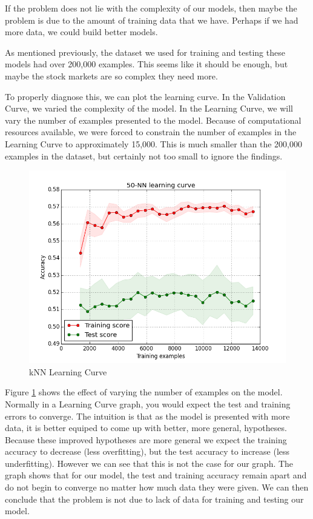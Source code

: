 \documentclass{report}
\begin{document}
If the problem does not lie with the complexity of our models, then maybe the problem is due to the amount of training data that we have. Perhaps if we had more data, we could build better models.

As mentioned previously, the dataset we used for training and testing these models had over 200,000 examples. This seems like it should be enough, but maybe the stock markets are so complex they need more.

To properly diagnose this, we can plot the learning curve. In the Validation Curve, we varied the complexity of the model. In the Learning Curve, we will vary the number of examples presented to the model. Because of computational resources available, we were forced to constrain the number of examples in the Learning Curve to approximately 15,000. This is much smaller than the 200,000 examples in the dataset, but certainly not too small to ignore the findings.

\begin{figure}[H]
	\caption{kNN Learning Curve}
	\centerline{\includegraphics[scale=0.75]{vis/50-learning-curve-15000.png}}
	\label{fig:knn-learning}
\end{figure}

Figure \ref{fig:knn-learning} shows the effect of varying the number of examples on the model. Normally in a Learning Curve graph, you would expect the test and training errors to converge. The intuition is that as the model is presented with more data, it is better equiped to come up with better, more general, hypotheses. Because these improved hypotheses are more general we expect the training accuracy to decrease (less overfitting), but the test accuracy to increase (less underfitting). However we can see that this is not the case for our graph. The graph shows that for our model, the test and training accuracy remain apart and do not begin to converge no matter how much data they were given. We can then conclude that the problem is not due to lack of data for training and testing our model.
\end{document}
